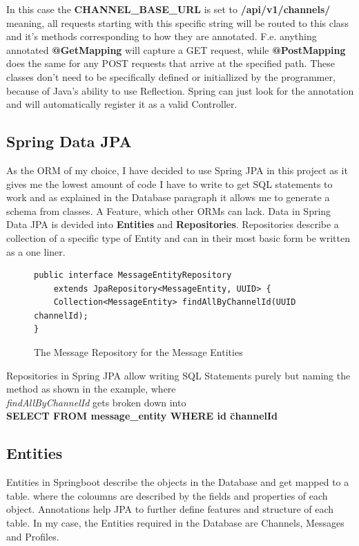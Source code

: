 \documentclass[a4paper,12pt]{article}
\begin{document}
	In this case the \textbf{CHANNEL\_BASE\_URL} is set to \textbf{/api/v1/channels/} meaning, all requests starting
	with this specific string will be routed to this class and it's methods corresponding to how they are annotated.
	F.e. anything annotated \textbf{@GetMapping} will capture a GET request, while \textbf{@PostMapping} does the 
	same for any POST requests that arrive at the specified path. These classes don't need to be specifically defined
	or initiallized by the programmer, because of Java's ability to use Reflection. Spring can just look for the
	annotation and will automatically register it as a valid Controller.

	\subsection{Spring Data JPA}
	\label{subsec:spring_data_jpa}
	As the ORM of my choice, I have decided to use Spring JPA in this project as it gives me the lowest amount of
	code I have to write to get SQL statements to work and as explained in the Database paragraph it allows me to
	generate a schema from classes. A Feature, which other ORMs can lack.
	Data in Spring Data JPA is devided into \textbf{Entities} and \textbf{Repositories}. Repositories describe a
	collection of a specific type of Entity and can in their most basic form be written as a one liner.
	\begin{figure}[ht!]
		\begin{lstlisting}
public interface MessageEntityRepository 
	extends JpaRepository<MessageEntity, UUID> {
	Collection<MessageEntity> findAllByChannelId(UUID channelId);
}
		\end{lstlisting}
		\caption{The Message Repository for the Message Entities}
	\end{figure}
	Repositories in Spring JPA allow writing SQL Statements purely but naming the method as shown in the example,
	where\\ 
	\textit{findAllByChannelId} gets broken down into \\ 
	\textbf{SELECT \* FROM message\_entity WHERE id \= channelId}

	\subsection*{Entities}
	Entities in Springboot describe the objects in the Database and get mapped to a table. where the coloumns are
	described by the fields and properties of each object. Annotations help JPA to further define features and
	structure of each table. In my case, the Entities required in the Database are Channels, Messages and Profiles.
\end{document}
